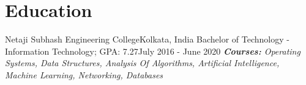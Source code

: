 \documentclass[../../main.tex]{subfiles}
\begin{document}
    \section{Education}
    \resumeSubHeadingListStart
    \resumeSubheading
        {Netaji Subhash Engineering College}{Kolkata, India}
        {Bachelor of Technology - Information Technology;  GPA: 7.27}{July 2016 - June 2020}
        {\scriptsize \textit{ \footnotesize{\newline{}\textbf{Courses:} Operating Systems, Data Structures, Analysis Of Algorithms, Artificial Intelligence, Machine Learning, Networking, Databases}}}
    \resumeSubHeadingListEnd
    \vspace{-5pt}
\end{document}
